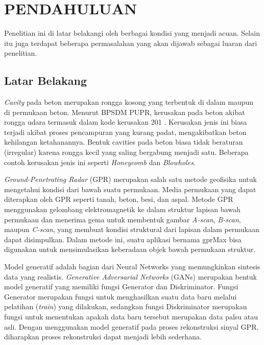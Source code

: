 \chapter{PENDAHULUAN}
\label{chap:pendahuluan}


Penelitian ini di latar belakangi oleh berbagai kondisi yang menjadi acuan. 
Selain itu juga terdapat beberapa permasalahan yang akan dijawab sebagai luaran dari penelitian.


\section{Latar Belakang}
\label{sec:latarbelakang}

\emph{Cavity} pada beton merupakan rongga kosong yang terbentuk di dalam maupun di permukaan beton. 
Menurut BPSDM PUPR, kerusakan pada beton akibat rongga udara termasuk dalam kode kerusakan 201 \parencite{jenisKerusakanJembatan}. 
Kerusakan jenis ini biasa terjadi akibat proses pencampuran yang kurang padat, mengakibatkan beton kehilangan ketahanannya. 
Bentuk cavities pada beton biasa tidak beraturan (irregular) karena rongga kecil yang saling bergabung menjadi satu. 
Beberapa contoh kerusakan jenis ini seperti \emph{Honeycomb} dan \emph{Blowholes}. 

\emph{Ground-Penetrating Radar} (GPR) merupakan salah satu metode geofisika untuk mengetahui kondisi dari bawah suatu permukaan. 
Media permukaan yang dapat diterapkan oleh GPR seperti tanah, beton, besi, dan aspal. 
Metode GPR menggunakan gelombang elektromagnetik ke dalam struktur lapisan bawah permukaan dan menerima gema untuk membentuk gambar 
\emph{A-scan}, \emph{B-scan}, maupun \emph{C-scan}, yang membuat kondisi struktural dari lapisan dalam permukaan dapat disimpulkan. 
Dalam metode ini, suatu aplikasi bernama gprMax bisa digunakan untuk mensimulasikan keberadaan objek bawah permukaan struktur.

Model generatif adalah bagian dari Neural Networks yang memungkinkan sintesis data yang realistis. 
\emph{Generative Adversarial Networks} (GANs) merupakan bentuk model generatif yang memiliki fungsi Generator dan Diskriminator. 
Fungsi Generator merupakan fungsi untuk menghasilkan suatu data baru melalui pelatihan (\emph{train}) yang dilakukan, 
sedangkan fungsi Diskriminator merupakan fungsi untuk menentukan apakah data baru tersebut merupakan data palsu atau asli. 
Dengan menggunakan model generatif pada proses rekonstruksi sinyal GPR, diharapkan proses rekonstruksi dapat menjadi lebih sederhana.

